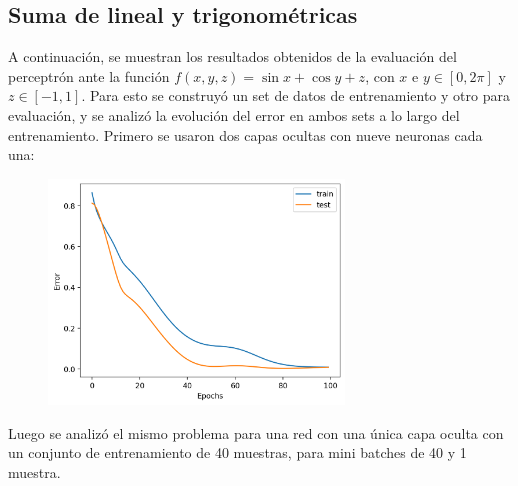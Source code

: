 \documentclass[12pt,a4paper]{article}
\begin{document}
\subsection{Suma de lineal y trigonométricas}
A continuación, se muestran los resultados obtenidos de la evaluación del perceptrón ante la función $f(x,y,z) = \sin x + \cos y + z$, con $x$ e $y \in [0,2\pi]$ y $z \in [-1,1]$. Para esto se construyó un set de datos de entrenamiento y otro para evaluación, y se analizó la evolución del error en ambos sets a lo largo del entrenamiento. Primero se usaron dos capas ocultas con nueve neuronas cada una:
\begin{figure}[H]
    \includegraphics[width=0.7\textwidth]{img/13-training_error.png}
    \centering
\end{figure}
Luego se analizó el mismo problema para una red con una única capa oculta con un conjunto de entrenamiento de 40 muestras, para mini batches de 40 y 1 muestra.
\end{document}
